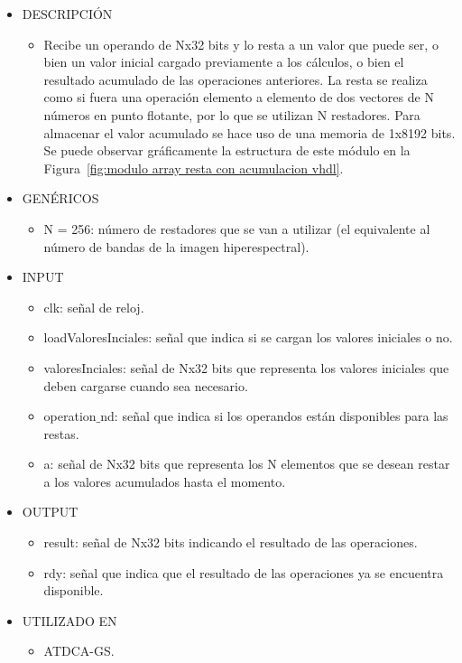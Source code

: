 \begin{itemize}
    \item DESCRIPCIÓN
        \begin{itemize}
            \item Recibe un operando de Nx32 bits y lo resta a un valor que puede ser, o bien un valor inicial cargado previamente a los cálculos, o bien el resultado acumulado de las operaciones anteriores. La resta se realiza como si fuera una operación elemento a elemento de dos vectores de N números en punto flotante, por lo que se utilizan N restadores. Para almacenar el valor acumulado se hace uso de una memoria de 1x8192 bits. Se puede observar gráficamente la estructura de este módulo en la Figura~\ref{fig:modulo array resta con acumulacion vhdl}.
        \end{itemize}
    \item GENÉRICOS
        \begin{itemize}
            \item N = 256: número de restadores que se van a utilizar (el equivalente al número de bandas de la imagen hiperespectral).
        \end{itemize}
    \item INPUT
        \begin{itemize}
            \item clk: señal de reloj.
            \item loadValoresInciales: señal que indica si se cargan los valores iniciales o no.
            \item valoresInciales: señal de Nx32 bits que representa los valores iniciales que deben cargarse cuando sea necesario.
            \item operation$\_$nd: señal que indica si los operandos están disponibles para las restas.
            \item a: señal de Nx32 bits que representa los N elementos que se desean restar a los valores acumulados hasta el momento.
        \end{itemize}
    \item OUTPUT
        \begin{itemize}
            \item result: señal de Nx32 bits indicando el resultado de las operaciones.
            \item rdy: señal que indica que el resultado de las operaciones ya se encuentra disponible.
        \end{itemize}
    \item UTILIZADO EN
        \begin{itemize}
            \item ATDCA-GS.
        \end{itemize}
\end{itemize}

